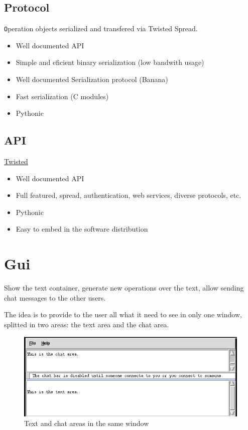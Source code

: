 \documentclass{report}
\begin{document}
\subsection{Protocol}

{\texttt Operation} objects serialized and transfered via Twisted Spread.

\begin{itemize}
\item Well documented API
\item Simple and eficient binary serialization (low bandwith usage)
\item Well documented Serialization protocol (Banana)
\item Fast serialization (C modules)
\item Pythonic
\end{itemize}

\subsection{API}
  
\href{http://www.twistedmatrix.com}{Twisted}

\begin{itemize}
\item Well documented API
\item Full featured, spread, authentication, web services, diverse protocols, etc.
\item Pythonic
\item Easy to embed in the software distribution
\end{itemize}
\section{Gui}

Show the text container, generate new operations over the text, allow sending chat messages to the other users.

The idea is to provide to the user all what it need to see in only one window, splitted in two areas: the text area and the chat area.

\begin{figure}[htbp]
 \begin{center}
    \includegraphics[angle=0,width=0.5\linewidth]{schemas/text_and_chat_area.png}
 \end{center}
 \label{fig:textandchatarea}
 \caption{Text and chat areas in the same window}
\end{figure}
\end{document}
